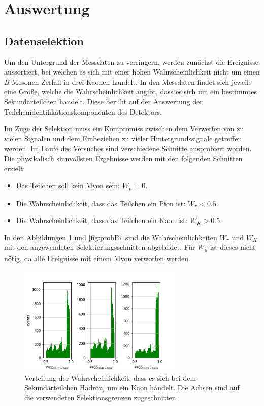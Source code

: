 \section{Auswertung}
\subsection{Datenselektion}
Um den Untergrund der Messdaten zu verringern, werden zunächst die Ereignisse aussortiert, bei welchen es sich mit einer hohen Wahrscheinlichkeit nicht um einen $B$-Mesonen Zerfall in drei Kaonen handelt. In den Messdaten findet sich jeweils eine Größe, welche die Wahrscheinlichkeit angibt, dass es sich um ein bestimmtes Sekundärteilchen handelt. Diese beruht auf der Auswertung der Teilchenidentifikationskomponenten des Detektors.

Im Zuge der Selektion muss ein Kompromiss zwischen dem Verwerfen von zu vielen Signalen und dem Einbeziehen zu vieler Hintergrundssignale getroffen werden.
Im Laufe des Versuches sind verschiedene Schnitte ausprobiert worden. Die physikalisch sinnvollsten Ergebnisse werden mit den folgenden Schnitten erzielt:
\begin{itemize}
  \item Das Teilchen soll kein Myon sein: $W_{\mu}=0$.
  \item Die Wahrscheinlichkeit, dass das Teilchen ein Pion ist: $W_{\pi}<0.5$.
  \item Die Wahrscheinlichkeit, dass das Teilchen ein Kaon ist: $W_{K}>0.5$.
\end{itemize}
In den Abbildungen \ref{fig:probK} und \ref{fig:probPi} sind die Wahrscheinlichkeiten $W_{\pi}$ und $W_{K}$ mit den angewendeten Selektierungsschnitten abgebildet. Für $W_{\mu}$ ist dieses nicht nötig, da alle Ereignisse mit einem Myon verworfen werden.
\begin{figure}
  \centering
  \includegraphics[width=0.7\textwidth]{plots/sim_ProbK_hist.png}
  \caption{Verteilung der Wahrscheinlichkeit, dass es sich bei dem Sekundärteilchen Hadron$_i$ um ein Kaon handelt. Die Achsen sind auf die verwendeten Selektionsgrenzen zugeschnitten.}
  \label{fig:probK}
\end{figure}
